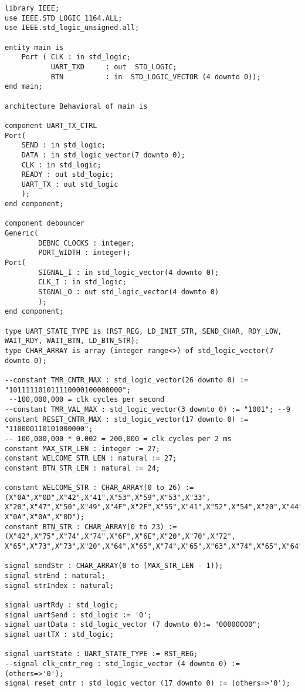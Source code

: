 \documentclass{article}
\begin{document}
\begin{verbatim}
library IEEE;
use IEEE.STD_LOGIC_1164.ALL;
use IEEE.std_logic_unsigned.all;

entity main is
    Port ( CLK : in std_logic;
           UART_TXD 	: out  STD_LOGIC;
           BTN 			: in  STD_LOGIC_VECTOR (4 downto 0));
end main;

architecture Behavioral of main is

component UART_TX_CTRL
Port(
	SEND : in std_logic;
	DATA : in std_logic_vector(7 downto 0);
	CLK : in std_logic;          
	READY : out std_logic;
	UART_TX : out std_logic
	);
end component;

component debouncer
Generic(
        DEBNC_CLOCKS : integer;
        PORT_WIDTH : integer);
Port(
		SIGNAL_I : in std_logic_vector(4 downto 0);
		CLK_I : in std_logic;          
		SIGNAL_O : out std_logic_vector(4 downto 0)
		);
end component;

type UART_STATE_TYPE is (RST_REG, LD_INIT_STR, SEND_CHAR, RDY_LOW, WAIT_RDY, WAIT_BTN, LD_BTN_STR);
type CHAR_ARRAY is array (integer range<>) of std_logic_vector(7 downto 0);

--constant TMR_CNTR_MAX : std_logic_vector(26 downto 0) := "101111101011110000100000000";
 --100,000,000 = clk cycles per second
--constant TMR_VAL_MAX : std_logic_vector(3 downto 0) := "1001"; --9
constant RESET_CNTR_MAX : std_logic_vector(17 downto 0) := "110000110101000000";
-- 100,000,000 * 0.002 = 200,000 = clk cycles per 2 ms
constant MAX_STR_LEN : integer := 27;
constant WELCOME_STR_LEN : natural := 27;
constant BTN_STR_LEN : natural := 24;

constant WELCOME_STR : CHAR_ARRAY(0 to 26) := (X"0A",X"0D",X"42",X"41",X"53",X"59",X"53",X"33",
X"20",X"47",X"50",X"49",X"4F",X"2F",X"55",X"41",X"52",X"54",X"20",X"44",X"45",X"4D",X"4F",X"21",
X"0A",X"0A",X"0D");
constant BTN_STR : CHAR_ARRAY(0 to 23) := (X"42",X"75",X"74",X"74",X"6F",X"6E",X"20",X"70",X"72",
X"65",X"73",X"73",X"20",X"64",X"65",X"74",X"65",X"63",X"74",X"65",X"64",X"21",X"0A",X"0D");

signal sendStr : CHAR_ARRAY(0 to (MAX_STR_LEN - 1));
signal strEnd : natural;
signal strIndex : natural;

signal uartRdy : std_logic;
signal uartSend : std_logic := '0';
signal uartData : std_logic_vector (7 downto 0):= "00000000";
signal uartTX : std_logic;

signal uartState : UART_STATE_TYPE := RST_REG;
--signal clk_cntr_reg : std_logic_vector (4 downto 0) := (others=>'0'); 
signal reset_cntr : std_logic_vector (17 downto 0) := (others=>'0');


\end{verbatim}
\end{document}
